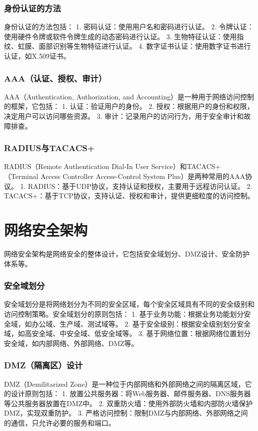 \documentclass{book}
\begin{document}
\subsubsection{身份认证的方法}
身份认证的方法包括：
1. 密码认证：使用用户名和密码进行认证。
2. 令牌认证：使用硬件令牌或软件令牌生成的动态密码进行认证。
3. 生物特征认证：使用指纹、虹膜、面部识别等生物特征进行认证。
4. 数字证书认证：使用数字证书进行认证，如X.509证书。
\subsubsection{AAA（认证、授权、审计）}
AAA（Authentication, Authorization, and Accounting）是一种用于网络访问控制的框架，它包括：
1. 认证：验证用户的身份。
2. 授权：根据用户的身份和权限，决定用户可以访问哪些资源。
3. 审计：记录用户的访问行为，用于安全审计和故障排查。
\subsubsection{RADIUS与TACACS+}
RADIUS（Remote Authentication Dial-In User Service）和TACACS+（Terminal Access Controller Access-Control System Plus）是两种常用的AAA协议。
1. RADIUS：基于UDP协议，支持认证和授权，主要用于远程访问认证。
2. TACACS+：基于TCP协议，支持认证、授权和审计，提供更细粒度的访问控制。
\section{网络安全架构}
网络安全架构是网络安全的整体设计，它包括安全域划分、DMZ设计、安全防护体系等。
\subsubsection{安全域划分}
安全域划分是将网络划分为不同的安全区域，每个安全区域具有不同的安全级别和访问控制策略。安全域划分的原则包括：
1. 基于业务功能：根据业务功能划分安全域，如办公域、生产域、测试域等。
2. 基于安全级别：根据安全级别划分安全域，如高安全域、中安全域、低安全域等。
3. 基于网络位置：根据网络位置划分安全域，如内部网络、外部网络、DMZ等。
\subsubsection{DMZ（隔离区）设计}
DMZ（Demilitarized Zone）是一种位于内部网络和外部网络之间的隔离区域，它的设计原则包括：
1. 放置公共服务器：将Web服务器、邮件服务器、DNS服务器等公共服务器放置在DMZ中。
2. 双重防火墙：使用外部防火墙和内部防火墙保护DMZ，实现双重防护。
3. 严格访问控制：限制DMZ与内部网络、外部网络之间的通信，只允许必要的服务和端口。
\end{document}
